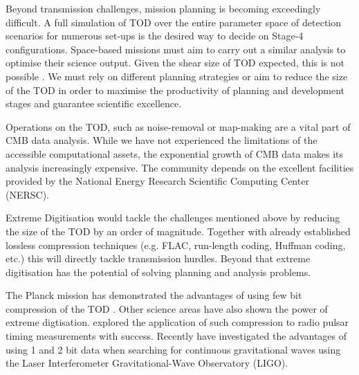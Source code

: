 \documentclass[apj]{emulateapj}
\begin{document}


Beyond transmission challenges, mission planning is becoming exceedingly difficult. A full simulation of TOD over the entire parameter space of detection scenarios for numerous set-ups is the desired way to decide on Stage-4 configurations. Space-based missions must aim to carry out a similar analysis to optimise their science output. Given the shear size of TOD expected, this is not possible \citep{s4sciencebook}. We must rely on different planning strategies or aim to reduce the size of the TOD in order to maximise the productivity of planning and development stages and guarantee scientific excellence.


Operations on the TOD, such as noise-removal or map-making are a vital part of CMB data analysis. While we have not experienced the limitations of the accessible computational assets, the exponential growth of CMB data makes its analysis increasingly expensive. The community depends on the excellent facilities provided by the National Energy Research Scientific Computing Center (NERSC).


Extreme Digitisation would tackle the challenges mentioned above by reducing the size of the TOD by an order of magnitude. Together with already established lossless compression techniques (e.g. FLAC, run-length coding, Huffman coding, etc.) this will directly tackle transmission hurdles. Beyond that extreme digitisation has the potential of solving planning and analysis problems.

The Planck mission has demonstrated the advantages of using few bit compression of the TOD \citep{maris2003}. Other science areas have also shown the power of extreme digtisation. \citep{jenet1998} explored the application of such compression to radio pulsar timing measurements with success. Recently \citep{clearwater2018} have investigated the advantages of using 1 and 2 bit data when searching for continuous gravitational waves using the Laser Interferometer Gravitational-Wave Observatory (LIGO).
\end{document}
